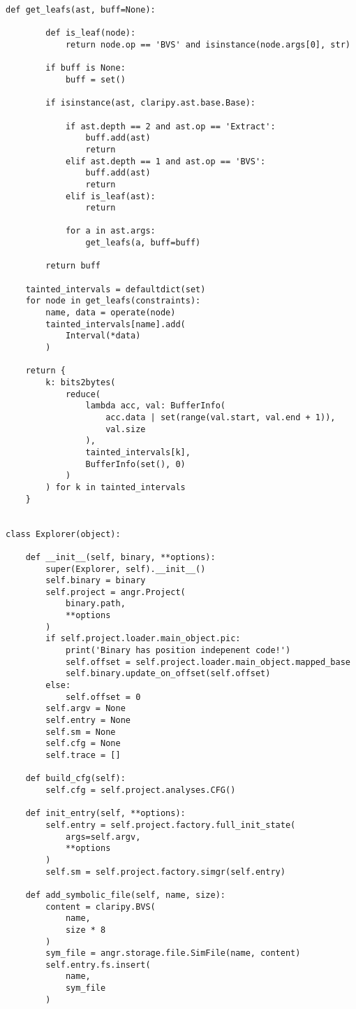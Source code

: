 \begin{lstlisting}[environoment=py_code, caption=taint\_influence.py, captionpos=b]
    def get_leafs(ast, buff=None):

        def is_leaf(node):
            return node.op == 'BVS' and isinstance(node.args[0], str)

        if buff is None:
            buff = set()

        if isinstance(ast, claripy.ast.base.Base):

            if ast.depth == 2 and ast.op == 'Extract':
                buff.add(ast)
                return
            elif ast.depth == 1 and ast.op == 'BVS':
                buff.add(ast)
                return
            elif is_leaf(ast):
                return

            for a in ast.args:
                get_leafs(a, buff=buff)

        return buff

    tainted_intervals = defaultdict(set)
    for node in get_leafs(constraints):
        name, data = operate(node)
        tainted_intervals[name].add(
            Interval(*data)
        )

    return {
        k: bits2bytes(
            reduce(
                lambda acc, val: BufferInfo(
                    acc.data | set(range(val.start, val.end + 1)),
                    val.size
                ),
                tainted_intervals[k],
                BufferInfo(set(), 0)
            )
        ) for k in tainted_intervals
    }


class Explorer(object):

    def __init__(self, binary, **options):
        super(Explorer, self).__init__()
        self.binary = binary
        self.project = angr.Project(
            binary.path,
            **options
        )
        if self.project.loader.main_object.pic:
            print('Binary has position indepenent code!')
            self.offset = self.project.loader.main_object.mapped_base
            self.binary.update_on_offset(self.offset)
        else:
            self.offset = 0
        self.argv = None
        self.entry = None
        self.sm = None
        self.cfg = None
        self.trace = []

    def build_cfg(self):
        self.cfg = self.project.analyses.CFG()

    def init_entry(self, **options):
        self.entry = self.project.factory.full_init_state(
            args=self.argv,
            **options
        )
        self.sm = self.project.factory.simgr(self.entry)

    def add_symbolic_file(self, name, size):
        content = claripy.BVS(
            name,
            size * 8
        )
        sym_file = angr.storage.file.SimFile(name, content)
        self.entry.fs.insert(
            name,
            sym_file
        )


\end{lstlisting}
